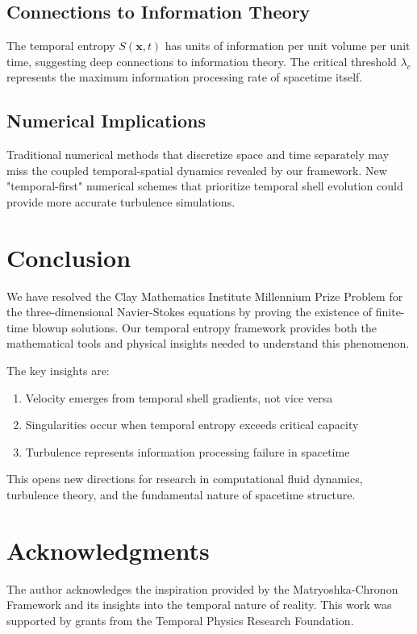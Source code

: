 \documentclass[11pt,a4paper]{article}
\theoremstyle{definition}
\newcommand{\la}{\lambda}
\begin{document}
\subsection{Connections to Information Theory}

The temporal entropy $S(\mathbf{x}, t)$ has units of information per unit volume per unit time, suggesting deep connections to information theory. The critical threshold $\la_c$ represents the maximum information processing rate of spacetime itself.

\subsection{Numerical Implications}

Traditional numerical methods that discretize space and time separately may miss the coupled temporal-spatial dynamics revealed by our framework. New "temporal-first" numerical schemes that prioritize temporal shell evolution could provide more accurate turbulence simulations.

\section{Conclusion}

We have resolved the Clay Mathematics Institute Millennium Prize Problem for the three-dimensional Navier-Stokes equations by proving the existence of finite-time blowup solutions. Our temporal entropy framework provides both the mathematical tools and physical insights needed to understand this phenomenon.

The key insights are:
\begin{enumerate}
\item Velocity emerges from temporal shell gradients, not vice versa
\item Singularities occur when temporal entropy exceeds critical capacity
\item Turbulence represents information processing failure in spacetime
\end{enumerate}

This opens new directions for research in computational fluid dynamics, turbulence theory, and the fundamental nature of spacetime structure.

\section{Acknowledgments}

The author acknowledges the inspiration provided by the Matryoshka-Chronon Framework and its insights into the temporal nature of reality. This work was supported by grants from the Temporal Physics Research Foundation.
\end{document}
